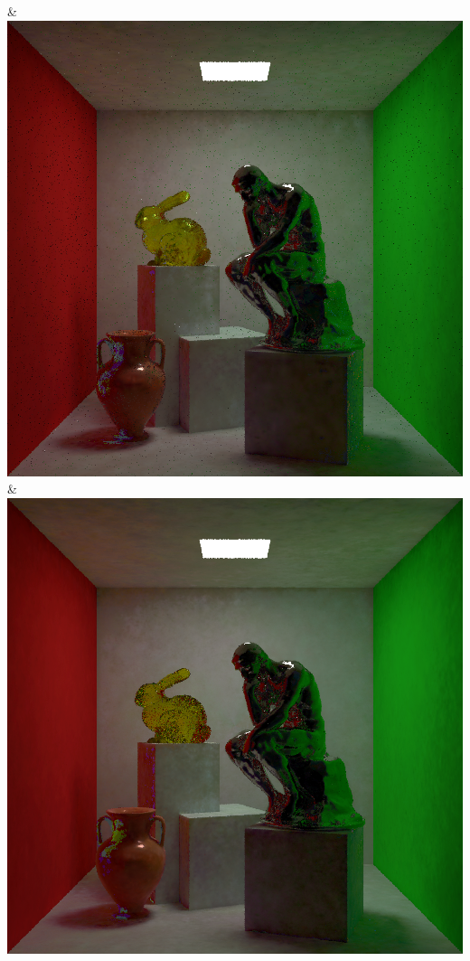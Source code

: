 & \includegraphics[width=\linewidth]{figures/py/tests/path_termination/bthk9_1spp_thinker.png}
& \includegraphics[width=\linewidth]{figures/py/tests/path_termination/1stdiff_1spp_thinker.png}
